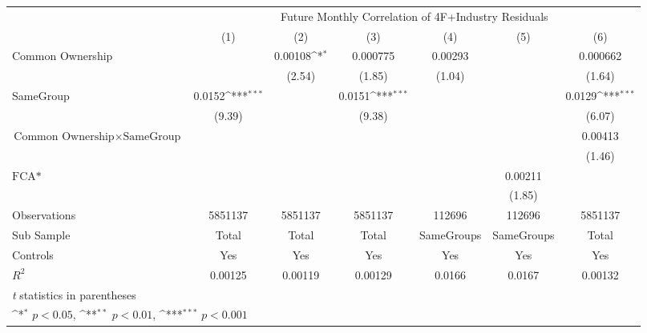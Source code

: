 {
\def\sym#1{\ifmmode^{#1}\else\(^{#1}\)\fi}
\begin{tabular}{l*{6}{c}}
\hline\hline
                &\multicolumn{6}{c}{Future Monthly Correlation of 4F+Industry Residuals}                                          \\\cmidrule(lr){2-7}
                &\multicolumn{1}{c}{(1)}         &\multicolumn{1}{c}{(2)}         &\multicolumn{1}{c}{(3)}         &\multicolumn{1}{c}{(4)}         &\multicolumn{1}{c}{(5)}         &\multicolumn{1}{c}{(6)}         \\
\hline
 Common Ownership &                  &  0.00108\sym{*}  & 0.000775         &  0.00293         &                  & 0.000662         \\
                &                  &   (2.54)         &   (1.85)         &   (1.04)         &                  &   (1.64)         \\
[1em]
SameGroup       &   0.0152\sym{***}&                  &   0.0151\sym{***}&                  &                  &   0.0129\sym{***}\\
                &   (9.39)         &                  &   (9.38)         &                  &                  &   (6.07)         \\
[1em]
 $ \text{Common Ownership} \times  {\text{SameGroup} }  $ &                  &                  &                  &                  &                  &  0.00413         \\
                &                  &                  &                  &                  &                  &   (1.46)         \\
[1em]
$ \text{FCA*} $ &                  &                  &                  &                  &  0.00211         &                  \\
                &                  &                  &                  &                  &   (1.85)         &                  \\
\hline
Observations    &  5851137         &  5851137         &  5851137         &   112696         &   112696         &  5851137         \\
Sub Sample      &    Total         &    Total         &    Total         &SameGroups         &SameGroups         &    Total         \\
Controls        &      Yes         &      Yes         &      Yes         &      Yes         &      Yes         &      Yes         \\
$ R^2 $         &  0.00125         &  0.00119         &  0.00129         &   0.0166         &   0.0167         &  0.00132         \\
\hline\hline
\multicolumn{7}{l}{\footnotesize \textit{t} statistics in parentheses}\\
\multicolumn{7}{l}{\footnotesize \sym{*} \(p<0.05\), \sym{**} \(p<0.01\), \sym{***} \(p<0.001\)}\\
\end{tabular}
}
